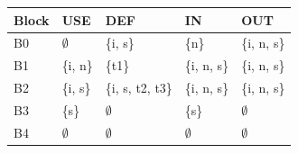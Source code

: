 \begin{tabular}{@{}lllll@{}}\toprule
\textbf{Block} & \textbf{USE} & \textbf{DEF} & \textbf{IN} & \textbf{OUT}\\ \midrule
B0 & $\emptyset$ & \{i, s\} & \{n\} & \{i, n, s\}\\
B1 & \{i, n\} & \{t1\} & \{i, n, s\} & \{i, n, s\}\\
B2 & \{i, s\} & \{i, s, t2, t3\} & \{i, n, s\} & \{i, n, s\}\\
B3 & \{s\} & $\emptyset$ & \{s\} & $\emptyset$\\
B4 & $\emptyset$ & $\emptyset$ & $\emptyset$ & $\emptyset$\\
\bottomrule
\end{tabular}
